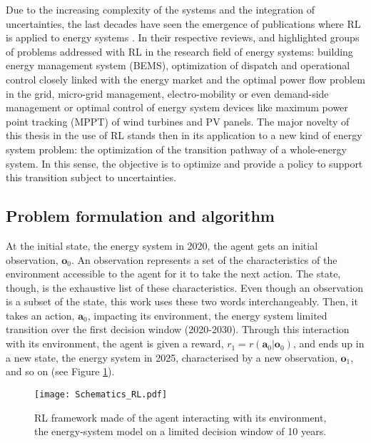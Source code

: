 Due to the increasing complexity of the systems and the integration of uncertainties, the last decades have seen the emergence of publications where \gls{RL} is applied to energy systems \cite{perera2021applications}. In their respective reviews, \citet{cao2020reinforcement} and \citet{perera2021applications} highlighted groups of problems addressed with \gls{RL} in the research field of energy systems: building energy management system (BEMS), optimization of dispatch and operational control closely linked with the energy market and the optimal power flow problem in the grid, micro-grid management, electro-mobility or even demand-side management or optimal control of energy system devices like maximum power point tracking (MPPT) of wind turbines and \gls{PV} panels.  The major novelty of this thesis in the use of \gls{RL} stands then in its application to a new kind of energy system problem: the optimization of the transition pathway of a whole-energy system. In this sense, the objective is to optimize and provide a policy to support this transition subject to uncertainties.

\subsection{Problem formulation and algorithm}
\label{subsec:meth_RL_algo}
At the initial state, \ie the energy system in 2020, the agent gets an initial observation, $\bm{o}_0$. An observation represents a set of the characteristics of the environment accessible to the agent for it to take the next action. The state, though, is the exhaustive list of these characteristics. Even though an observation is a subset of the state, this work uses these two words interchangeably. Then, it takes an action, $\bm{a}_0$, impacting its environment, \ie the energy system limited transition over the first decision window (2020-2030). Through this interaction with its environment, the agent is given a reward, $r_1=r\left(\bm{a}_0 | \bm{o}_0 \right)$, and ends up in a new state, \ie the energy system in 2025, characterised by a new observation, $\bm{o}_1$, and so on (see Figure \ref{fig:Schematics_RL}).


\begin{figure}[!htbp]
\centering
\texttt{[image: Schematics\_RL.pdf]}
\caption{\Acrfull{RL} framework made of the agent interacting with its environment, \ie the energy-system model on a limited decision window of 10 years.}
\label{fig:Schematics_RL}
\end{figure}


